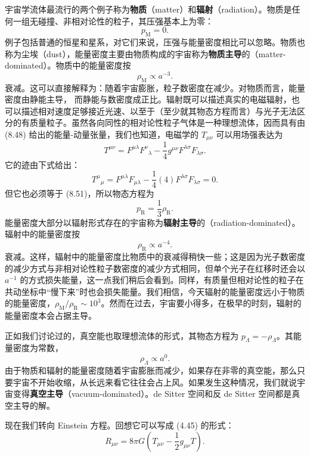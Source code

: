 宇宙学流体最流行的两个例子称为\textbf{物质}（matter）和\textbf{辐射}（radiation）。物质是任何一组无碰撞、非相对论性的粒子，其压强基本上为零：
\begin{equation*}
p_{\mathrm{M}} = 0.
\tag{8.57}
\end{equation*}
例子包括普通的恒星和星系，对它们来说，压强与能量密度相比可以忽略。物质也称为尘埃（dust），能量密度主要由物质构成的宇宙称为\textbf{物质主导}的（matter-dominated）。物质中的能量密度按
\begin{equation*}
\rho_{\mathrm{M}} \propto a^{-3}.
\tag{8.58}
\end{equation*}
衰减。这可以直接解释为：随着宇宙膨胀，粒子数密度在减少。对物质而言，能量密度由静能主导，
而静能与数密度成正比。辐射既可以描述真实的电磁辐射，也可以描述相对速度足够接近光速、以至于（至少就其物态方程而言）与光子无法区分的有质量粒子。虽然各向同性的相对论性粒子气体是一种理想流体，因而具有由 (8.48) 给出的能量-动量张量，我们也知道，电磁学的 $T_{\mu\nu}$ 可以用场强表达为
\begin{equation*}
T^{\mu\nu} = F^{\mu\lambda}F^{\nu}{}_{\lambda} - \frac{1}{4}g^{\mu\nu}F^{\lambda\sigma}F_{\lambda\sigma}.
\tag{8.59}
\end{equation*}
它的迹由下式给出：
\begin{equation*}
T^\mu{}_\mu = F^{\mu\lambda}F_{\mu\lambda} - \frac{1}{4}(4)F^{\lambda\sigma}F_{\lambda\sigma} = 0.
\tag{8.60}
\end{equation*}
但它也必须等于 (8.51)，所以物态方程为
\begin{equation*}
p_{\mathrm{R}} = \frac{1}{3}\rho_{\mathrm{R}}.
\tag{8.61}
\end{equation*}
能量密度大部分以辐射形式存在的宇宙称为\textbf{辐射主导}的（radiation-dominated）。辐射中的能量密度按
\begin{equation*}
\rho_{\mathrm{R}} \propto a^{-4}.
\tag{8.62}
\end{equation*}
衰减。这样，辐射中的能量密度比物质中的衰减得稍快一些；这是因为光子数密度的减少方式与非相对论性粒子数密度的减少方式相同，但单个光子在红移时还会以 $a^{-1}$ 的方式损失能量，这一点我们稍后会看到。同样，有质量但相对论性的粒子在共动坐标中“慢下来”时也会损失能量。我们相信，今天辐射的能量密度远小于物质的能量密度，$\rho_{\mathrm{M}}/\rho_{\mathrm{R}}\sim 10^{3}$。然而在过去，宇宙要小得多，在极早的时刻，辐射的能量密度本会占据主导。

正如我们讨论过的，真空能也取理想流体的形式，其物态方程为 $p_{\Lambda}=-\rho_{\Lambda}$。其能量密度为常数，
\begin{equation*}
\rho_{\Lambda} \propto a^{0}.
\tag{8.63}
\end{equation*}
由于物质和辐射的能量密度随着宇宙膨胀而减少，如果存在非零的真空能，那么只要宇宙不开始收缩，从长远来看它往往会占上风。如果发生这种情况，我们就说宇宙变得\textbf{真空主导}（vacuum-dominated）。de Sitter 空间和反 de Sitter 空间都是真空主导的解。

现在我们转向 Einstein 方程。回想它可以写成 (4.45) 的形式：
\begin{equation*}
R_{\mu\nu} = 8\pi G\left(T_{\mu\nu} - \frac{1}{2}g_{\mu\nu}T\right).
\tag{8.64}
\end{equation*}
